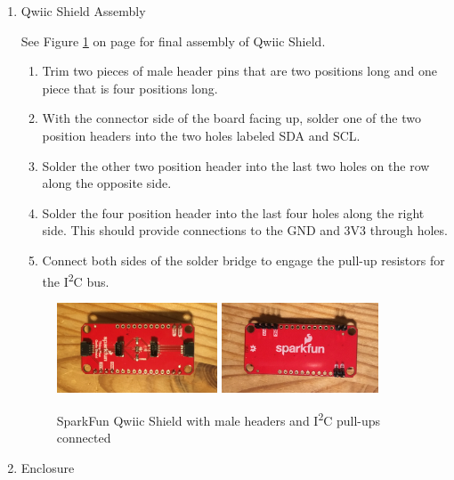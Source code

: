 \documentclass[11pt, letterpaper]{article}
\begin{document}
\begin{enumerate}

\item
Qwiic Shield Assembly

See Figure \ref{fig:qwiic} on page \pageref{fig:qwiic} for final assembly of Qwiic Shield.

\begin{enumerate}[label=1.\arabic*]
\item
Trim two pieces of male header pins that are two positions long and one piece that is four positions long.
\item
With the connector side of the board facing up, solder one of the two position headers into the two holes labeled SDA and SCL.
\item
Solder the other two position header into the last two holes on the row along the opposite side.
\item
Solder the four position header into the last four holes along the right side. This should provide connections to the GND and 3V3 through holes.
\item
Connect both sides of the solder bridge to engage the pull-up resistors for the I\textsuperscript{2}C bus.
\end{enumerate}

\begin{figure}[H]
\centering
\includegraphics[width=0.45\textwidth]{qwiic_top.JPG}
\includegraphics[width=0.44\textwidth]{qwiic_bottom.JPG}
\caption{SparkFun Qwiic Shield with male headers and I\textsuperscript{2}C pull-ups connected}
\label{fig:qwiic}
\end{figure}

\item \label{itm:enclosure}
Enclosure


\end{enumerate}
\end{document}
